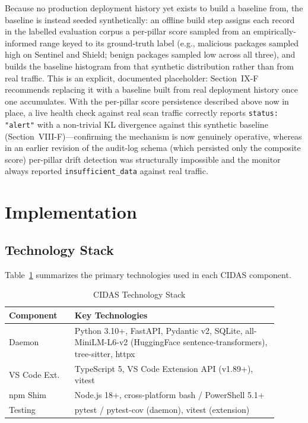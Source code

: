 \documentclass[journal]{IEEEtran}
\begin{document}
Because no production deployment history yet exists to build a baseline from, the baseline is instead seeded
synthetically: an offline build step assigns each record in the labelled evaluation corpus a per-pillar score
sampled from an empirically-informed range keyed to its ground-truth label (e.g., malicious packages sampled
high on Sentinel and Shield; benign packages sampled low across all three), and builds the baseline histogram
from that synthetic distribution rather than from real traffic. This is an explicit, documented placeholder:
Section~IX-F recommends replacing it with a baseline built from real deployment history once one accumulates.
With the per-pillar score persistence described above now in place, a live health check against real scan
traffic correctly reports \texttt{status: "alert"} with a non-trivial KL divergence against this synthetic
baseline (Section~VIII-F)---confirming the mechanism is now genuinely operative, whereas in an earlier
revision of the audit-log schema (which persisted only the composite score) per-pillar drift detection was
structurally impossible and the monitor always reported \texttt{insufficient\_data} against real traffic.

\section{Implementation}

\subsection{Technology Stack}
Table~\ref{tab:stack} summarizes the primary technologies used in each CIDAS component.

\begin{table}[t]
\caption{CIDAS Technology Stack}
\label{tab:stack}
\centering
\begin{tabular}{@{}p{0.22\linewidth}p{0.68\linewidth}@{}}
\toprule
\textbf{Component} & \textbf{Key Technologies} \\
\midrule
Daemon & Python 3.10+, FastAPI, Pydantic v2, SQLite, all-MiniLM-L6-v2 (HuggingFace sentence-transformers), tree-sitter, httpx \\
VS Code Ext. & TypeScript 5, VS Code Extension API (v1.89+), vitest \\
npm Shim & Node.js 18+, cross-platform bash / PowerShell 5.1+ \\
Testing & pytest / pytest-cov (daemon), vitest (extension) \\
\bottomrule
\end{tabular}
\end{table}
\end{document}
